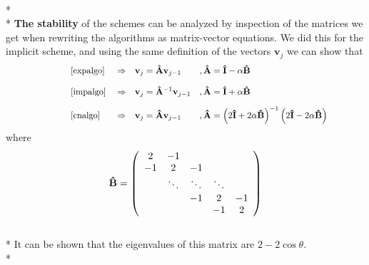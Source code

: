\documentclass[norsk, a4paper]{article}
\newcommand\lr[1]{\left(#1\right)}
\begin{document}
\\*\\*
\textbf{The stability} of the schemes can be analyzed  by inspection of the matrices we get when rewriting the algorithms as matrix-vector equations. We did this for the implicit scheme, and using the same definition of the vectors $\textbf{v}_j$ we can show that
\begin{align*}
&&&&&\eqref{expalgo}& &\Rightarrow & &{\bf v}_j = {\bf \hat{A}v}_{j-1}& &,{\bf \hat{A}} = {\bf \hat{I}} -\alpha {\bf \hat{B}}&&&&&\\*
&&&&&\eqref{impalgo}& &\Rightarrow & &{\bf v}_j = {\bf \hat{A}}^{-1}{\bf  v}_{j-1}& &,{\bf \hat{A}} = {\bf \hat{I}} +\alpha {\bf \hat{B}}&&&&&\phantom{\bigg)^2}\\*
\phantom{\lr{2{\bf \hat{I}} -2\alpha {\bf \hat{B}}}}&&&&&\eqref{cnalgo}& &\Rightarrow & &{\bf v}_j = {\bf \hat{A}v}_{j-1}& &,{\bf \hat{A}} = \lr{2{\bf \hat{I}} +2\alpha {\bf \hat{B}}}^{-1}\lr{2{\bf \hat{I}} -2\alpha {\bf \hat{B}}}&&&&&
\end{align*}
where
\begin{equation*}
    {\bf \hat{B}} = \left(\begin{array}{ccccc}
                           2 &-1  & & & \\
                           -1 &2 &-1  & & \\
                            &\ddots &\ddots &\ddots  & \\
                            &  &-1 &2 &-1 \\
                            &  & &-1 &2 \\
                      \end{array} \right)
\end{equation*}
\\*
It can be shown that the eigenvalues of this matrix are $2-2\cos\theta$.
\\*
\end{document}

